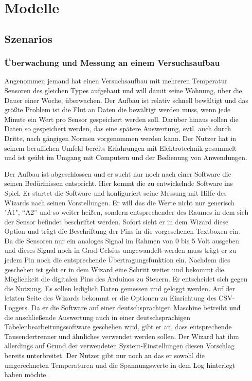 \chapter{Modelle}
\section{Szenarios}
\subsection{Überwachung und Messung an einem Versuchsaufbau}
Angenommen jemand hat einen Versuchsaufbau mit mehreren Temperatur Sensoren des gleichen Types aufgebaut und will damit seine Wohnung, über die Dauer einer Woche, überwachen. Der Aufbau ist relativ schnell bewältigt und das größte Problem ist die Flut an Daten die bewältigt werden muss, wenn jede Minute ein Wert pro Sensor gespeichert werden soll. Darüber hinaus sollen die Daten so gespeichert werden, das eine spätere Auswertung, evtl. auch durch Dritte, nach gängigen Normen vorgenommen werden kann. Der Nutzer hat in seinem beruflichen Umfeld bereits Erfahrungen mit Elektrotechnik gesammelt und ist geübt im Umgang mit Computern und der Bedienung von Anwendungen.

Der Aufbau ist abgeschlossen und er sucht nur noch nach einer Software die seinen Bedürfnissen entspricht. Hier kommt die zu entwickelnde Software ins Spiel. Er startet die Software und konfiguriert  seine Messung mit Hilfe des Wizards nach seinen Vorstellungen. Er will das die Werte nicht nur generisch "A1", "`A2"' und so weiter heißen, sondern entsprechender des Raumes in dem sich der Sensor befindet beschriftet werden. Sofort sieht er in dem Wizard diese Option und trägt die Beschriftung der Pins in die vorgesehenen Textboxen ein. Da die Sensoren nur ein analoges Signal im Rahmen von 0 bis 5 Volt ausgeben und dieses Signal noch in Grad Celsius umgewandelt werden muss trägt er zu jedem Pin noch die entsprechende Übertragungsfunktion ein. Nachdem dies geschehen ist geht er in dem Wizard eine Schritt weiter und bekommt die Möglichkeit die digitalen Pins des Arduinos zu Steuern. Er entscheidet sich gegen die Nutzung. Es sollen lediglich Daten gemessen und geloggt werden. Auf der letzten Seite des Wizards bekommt er die Optionen zu Einrichtung des \acrshort{CSV}-Loggers. Da er die Software auf einer deutschsprachigen Maschine betreibt und die anschließende Auswertung auch in einer deutschsprachigen Tabelenbearbeitungssoftware geschehen wird, gibt er an, dass entsprechende Tausendertrenner und ähnliches verwendet werden sollen. Der Wizard hat ihm allerdings auf Grund der verwendeten System-Einstellungen diesen Vorschlag bereits unterbreitet. Der Nutzer gibt nur noch an das er sowohl die umgerechneten Temperaturen und die Spannungswerte in dem Log hinterlegt haben möchte. 


